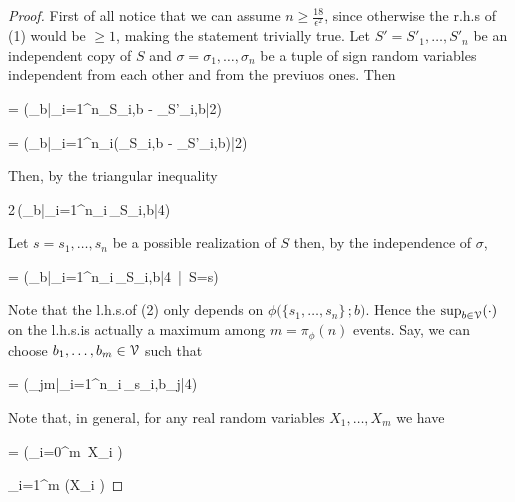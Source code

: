 \documentclass[scombinatorics.tex]{subfiles}
\begin{document}
\begin{proof}
  First of all notice that we can assume $n \ge \frac{18}{\epsilon^2}$, since otherwise the r.h.s of (1) would be $\ge 1$, making the statement trivially true. Let $S'=S'_1,\dots,S'_n$ be an independent copy of $S$ and $\sigma=\sigma_1,\dots,\sigma_n$ be a tuple of sign random variables independent from each other and from the previuos ones.
  Then
  
  {=}
  {\Pr\bigg(\sup_{b\in\V}\Big|\sum_{i=1}^n\Indicator_{S_i,b} - \Indicator_{S'_i,b}\Big|\ge{}2\bigg)}
  \smallskip
  

  \ceq{\hfill}
  {=}
  {\Pr\bigg(\sup_{b\in\V}\Big|\sum_{i=1}^n\sigma_i\big(\Indicator_{S_i,b} - \Indicator_{S'_i,b}\big)\Big|\ge{}2\bigg)}
  \smallskip

  Then, by the triangular inequality

  \ceq{}
  {\le}
  {2\,\Pr\bigg(\sup_{b\in\V}\Big|\sum_{i=1}^n\sigma_i\,\Indicator_{S_i,b}\Big|\ge{}4\bigg)}

    Let $s=s_1,\dots,s_n$ be a possible realization of $S$ then, by the independence of $\sigma$,\smallskip

  {=}
  {\Pr\bigg(\sup_{b\in\V}\Big|\sum_{i=1}^n\sigma_i\,\Indicator_{S_i,b}\Big|\ge{}4\ \big|\  S=s\bigg)}
  \smallskip

  Note that the l.h.s.\@ of (2) only depends on $\phi\big(\{s_1,\dots,s_n\}\,;b\big)$.
  Hence the $\sup_{b\in\EuScript V}(\cdot)$ on the l.h.s.\@ is actually a maximum among $m=\pi_\phi(n)$ events.
  Say, we can choose $b_1,\dots,b_m\in\EuScript V$ such that

  {=}
  {\Pr\bigg(\max_{j\le m}\Big|\sum_{i=1}^n\sigma_i\,\Indicator_{s_i,b_j}\Big|\ge{}4\bigg)}

  Note that, in general, for any real random variables $X_1,\dots,X_m$ we have

  {=}
  {\Pr\Big(\bigcup_{i=0}^m\ X_i \ge \epsilon\Big)}

  \ceq{}
  {\le}
  {\sum_{i=1}^m \Pr\big(X_i \ge\epsilon\big)}


\end{proof}
\end{document}

